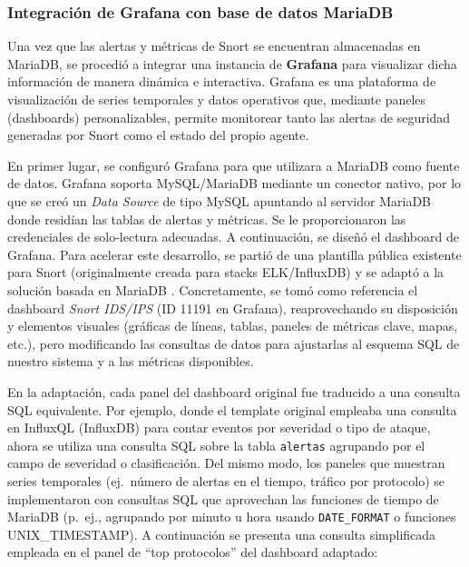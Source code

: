 \documentclass[11pt,a4paper,twoside]{report}
\begin{document}
\subsubsection{Integración de Grafana con base de datos MariaDB}

Una vez que las alertas y métricas de Snort se encuentran almacenadas en MariaDB, se procedió a integrar una instancia de \textbf{Grafana} para visualizar dicha información de manera dinámica e interactiva. Grafana es una plataforma de visualización de series temporales y datos operativos que, mediante paneles (dashboards) personalizables, permite monitorear tanto las alertas de seguridad generadas por Snort como el estado del propio agente.\newline

En primer lugar, se configuró Grafana para que utilizara a MariaDB como fuente de datos. Grafana soporta MySQL/MariaDB mediante un conector nativo, por lo que se creó un \textit{Data Source} de tipo MySQL apuntando al servidor MariaDB donde residían las tablas de alertas y métricas. Se le proporcionaron las credenciales de solo-lectura adecuadas. A continuación, se diseñó el dashboard de Grafana. Para acelerar este desarrollo, se partió de una plantilla pública existente para Snort (originalmente creada para stacks ELK/InfluxDB) y se adaptó a la solución basada en MariaDB \cite{grafana-dashboard}. Concretamente, se tomó como referencia el dashboard \emph{Snort IDS/IPS} (ID 11191 en Grafana), reaprovechando su disposición y elementos visuales (gráficas de líneas, tablas, paneles de métricas clave, mapas, etc.), pero modificando las consultas de datos para ajustarlas al esquema SQL de nuestro sistema y a las métricas disponibles.\newline

En la adaptación, cada panel del dashboard original fue traducido a una consulta SQL equivalente. Por ejemplo, donde el template original empleaba una consulta en InfluxQL (InfluxDB) para contar eventos por severidad o tipo de ataque, ahora se utiliza una consulta SQL sobre la tabla \texttt{alertas} agrupando por el campo de severidad o clasificación. Del mismo modo, los paneles que muestran series temporales (ej.~número de alertas en el tiempo, tráfico por protocolo) se implementaron con consultas SQL que aprovechan las funciones de tiempo de MariaDB (p.~ej., agrupando por minuto u hora usando \texttt{DATE\_FORMAT} o funciones UNIX\_TIMESTAMP). A continuación se presenta una consulta simplificada empleada en el panel de “top protocolos” del dashboard adaptado:
\end{document}

